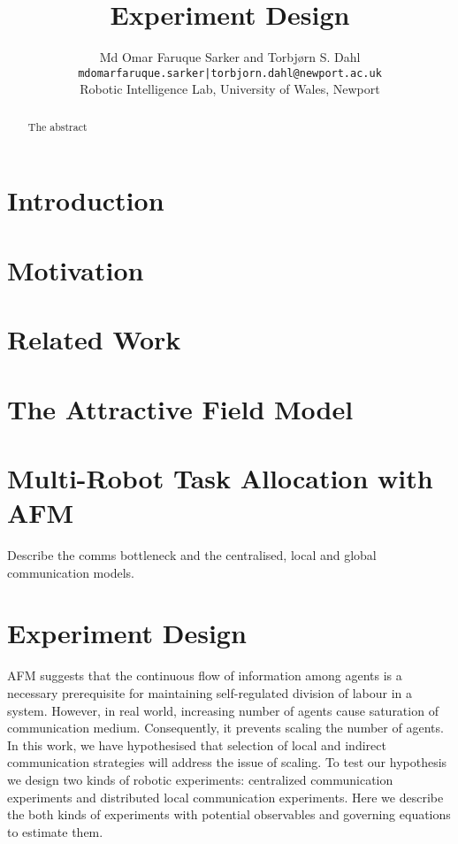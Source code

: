 \documentclass{article}
\begin{document}
\title{Experiment Design}
\author{
Md Omar Faruque Sarker and Torbj{\o}rn S. Dahl\\
{\tt mdomarfaruque.sarker|torbjorn.dahl@newport.ac.uk}\\
Robotic Intelligence Lab, University of Wales, Newport}
\date{}
\maketitle

\begin{abstract}
The abstract
\end{abstract}

\section{Introduction}

\section{Motivation}

\section{Related Work}

\section{The Attractive Field Model}

\section{Multi-Robot Task Allocation with AFM}
Describe the comms bottleneck and the centralised, local and global communication models.

\section{Experiment Design}

AFM suggests that the continuous flow of information among agents is a necessary prerequisite for maintaining self-regulated division of labour in a system. However, in real world, increasing number of agents cause saturation of communication medium. Consequently, it prevents scaling the number of agents. In this work, we have hypothesised that selection of local and indirect communication strategies will address the issue of scaling. To test our hypothesis we design two kinds of robotic experiments: centralized communication experiments and distributed local communication experiments. Here we describe the both kinds of experiments with potential observables and governing equations to estimate them.
%
\end{document}
